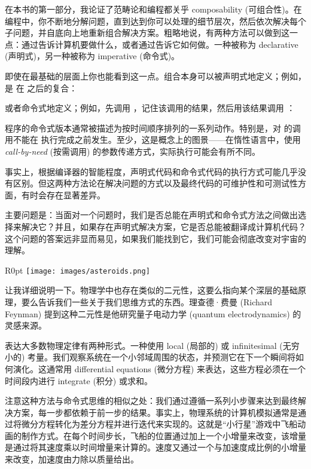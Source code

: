 
\lettrine[lhang=0.17]{在}{本书的第一部分}，我论证了范畴论和编程都关乎 composability (可组合性)。在编程中，你不断地分解问题，直到达到你可以处理的细节层次，然后依次解决每个子问题，并自底向上地重新组合解决方案。粗略地说，有两种方法可以做到这一点：通过告诉计算机要做什么，或者通过告诉它如何做。一种被称为 declarative (声明式)，另一种被称为 imperative (命令式)。

即使在最基础的层面上你也能看到这一点。组合本身可以被声明式地定义；例如， 是  在  之后的复合：

或者命令式地定义；例如，先调用 ，记住该调用的结果，然后用该结果调用 ：

程序的命令式版本通常被描述为按时间顺序排列的一系列动作。特别是，对  的调用不能在  执行完成之前发生。至少，这是概念上的图景——在惰性语言中，使用 \emph{call-by-need} (按需调用) 的参数传递方式，实际执行可能会有所不同。

事实上，根据编译器的智能程度，声明式代码和命令式代码的执行方式可能几乎没有区别。但这两种方法论在解决问题的方式以及最终代码的可维护性和可测试性方面，有时会存在显著差异。

主要问题是：当面对一个问题时，我们是否总能在声明式和命令式方法之间做出选择来解决它？并且，如果存在声明式解决方案，它是否总能被翻译成计算机代码？这个问题的答案远非显而易见，如果我们能找到它，我们可能会彻底改变对宇宙的理解。

\begin{wrapfigure}{R}{0pt}
  \texttt{[image: images/asteroids.png]}
\end{wrapfigure}

让我详细说明一下。物理学中也存在类似的二元性，这要么指向某个深层的基础原理，要么告诉我们一些关于我们思维方式的东西。理查德·费曼 (Richard Feynman) 提到这种二元性是他研究量子电动力学 (quantum electrodynamics) 的灵感来源。

表达大多数物理定律有两种形式。一种使用 local (局部的) 或 infinitesimal (无穷小的) 考量。我们观察系统在一个小邻域周围的状态，并预测它在下一个瞬间将如何演化。这通常用 differential equations (微分方程) 来表达，这些方程必须在一个时间段内进行 integrate (积分) 或求和。

注意这种方法与命令式思维的相似之处：我们通过遵循一系列小步骤来达到最终解决方案，每一步都依赖于前一步的结果。事实上，物理系统的计算机模拟通常是通过将微分方程转化为差分方程并进行迭代来实现的。这就是“小行星”游戏中飞船动画的制作方式。在每个时间步长，飞船的位置通过加上一个小增量来改变，该增量是通过将其速度乘以时间增量来计算的。速度又通过一个与加速度成比例的小增量来改变，加速度由力除以质量给出。

